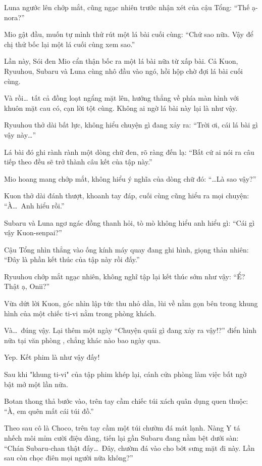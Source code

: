 \documentclass[../main.tex]{subfiles}
\begin{document}
Luna ngước lên chớp mắt, cũng ngạc nhiên trước nhận xét của cậu Tổng: ``Thế ạ-nora?''

Mio gật đầu, muốn tự mình thử rút một lá bài cuối cùng: ``Chứ sao nữa. Vậy để chị thử bốc lại một lá cuối cùng xem sao.''

Lần này, Sói đen Mio cẩn thận bốc ra một lá bài nữa từ xấp bài. Cả Kuon, Ryuuhou, Subaru và Luna cùng nhô đầu vào ngó, hồi hộp chờ đợi lá bài cuối cùng.

Và rồi\dots\ tất cả đồng loạt ngẩng mặt lên, hướng thẳng về phía màn hình với khuôn mặt cau có, cạn lời tột cùng. Không ai ngờ lá bài này lại là như vậy.

Ryuuhou thở dài bất lực, không hiểu chuyện gì đang xảy ra: ``Trời ơi, cái lá bài gì vậy này\dots''

Lá bài đó ghi rành rành một dòng chữ đen, rõ ràng đến lạ: ``Bất cứ ai nói ra câu tiếp theo đều sẽ trở thành câu kết của tập này.''

Mio hoang mang chớp mắt, không hiểu ý nghĩa của dòng chữ đó: ``\dots Là sao vậy?''

Kuon thở dài đánh thượt, khoanh tay đáp, cuối cùng cũng hiểu ra mọi chuyện: ``À\dots\ Anh hiểu rồi.''

Subaru và Luna ngơ ngác đồng thanh hỏi, tò mò không hiểu anh hiểu gì: ``Cái gì vậy Kuon-senpai?''

Cậu Tổng nhìn thẳng vào ống kính máy quay đang ghi hình, giọng thản nhiên: ``Đây là phần kết thúc của tập này rồi đấy.''

Ryuuhou chớp mắt ngạc nhiên, không nghĩ tập lại kết thúc sớm như vậy: ``Ể? Thật ạ, Onii?''

Vừa dứt lời Kuon, góc nhìn lập tức thu nhỏ dần, lùi về nằm gọn bên trong khung hình của một chiếc ti-vi nằm trong phòng khách.


Và\dots\ đúng vậy. Lại thêm một ngày ``Chuyện quái gì đang xảy ra vậy!?'' điển hình nữa tại văn phòng \hll, chẳng khác nào bao ngày qua.

Yep. Kết phim là như vậy đấy!

\omk

Sau khi "khung ti-vi" của tập phim khép lại, cánh cửa phòng làm việc bất ngờ bật mở một lần nữa.

Botan thong thả bước vào, trên tay cầm chiếc túi xách quân dụng quen thuộc: ``À, em quên mất cái túi đồ.''

Theo sau cô là Choco, trên tay cầm một túi chườm đá mát lạnh. Nàng Y tá nhếch môi mỉm cười điệu đàng, tiến lại gần Subaru đang nằm bệt dưới sàn: ``Chán Subaru-chan thật đấy\dots\ Đây, chườm đá vào cho bớt sưng mặt đi này. Lần sau còn chọc điên mọi người nữa không?''
\end{document}

